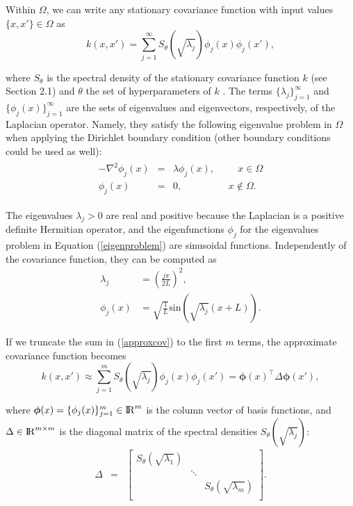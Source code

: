 \documentclass[]{interact}
\theoremstyle{plain}%
\theoremstyle{definition}
\theoremstyle{remark}
\begin{document}
Within $\Omega$, we can write any stationary covariance function with input values $\{x,x'\} \in \Omega$ as 
%
\begin{equation}\label{approxcov}
k(x,x') = \sum_{j=1}^\infty S_{\theta}(\sqrt{\lambda_j}) \phi_j(x) \phi_j(x'),
\end{equation} 

\noindent where $S_{\theta}$ is the spectral density of the stationary covariance function $k$ (see Section 2.1) and $\theta$ the set of hyperparameters of $k$ \citep{rasmussen2006gaussian}. The terms $\{\lambda_j\}_{j=1}^{\infty}$ and $\{\phi_j(x)\}_{j=1}^{\infty}$ are the sets of eigenvalues and eigenvectors, respectively, of the Laplacian operator. Namely, they satisfy the following eigenvalue problem in $\Omega$ when applying the Dirichlet boundary condition (other boundary conditions could be used as well):
%
\begin{eqnarray}\label{eigenproblem}
\begin{split}
-\nabla^2 \phi_j(x)&=&\lambda \phi_j(x), \hspace{1cm}  x \in \Omega \\ 
\phi_j(x)&=&0, \hspace{2cm} x \notin \Omega.
\end{split}
\end{eqnarray} 

\noindent The eigenvalues $\lambda_j>0$ are real and positive because the Laplacian is a positive definite Hermitian operator, and the eigenfunctions $\phi_j$ for the eigenvalues problem in Equation (\ref{eigenproblem}) are sinusoidal functions. Independently of the covariance function, they can be computed as
%
\begin{align}
\lambda_j&=\left(\frac{j\pi}{2L}\right)^2, \label{eigenvalue}\\
\phi_j(x)&=\sqrt{\frac{1}{L}} \text{sin}\left(\sqrt{\lambda_j}(x+L)\right). \label{eigenfunction}
\end{align}

If we truncate the sum in (\ref{approxcov}) to the first $m$ terms, the approximate covariance function becomes
%
\begin{equation}
k(x,x') \approx \sum_{j=1}^m S_{\theta}(\sqrt{\lambda_j}) \phi_j(x) \phi_j(x') = \bm{\phi}(x)^\intercal \Delta \bm{\phi}(x'), \nonumber
\end{equation}

\noindent where $\bm{\phi}(x)=\{\phi_j(x)\}_{j=1}^{m} \in {\rm I\!R}^{m}$ is the column vector of basis functions, and $\Delta  \in {\rm I\!R}^{m\times m}$ is the diagonal matrix of the spectral densities $S_{\theta}(\sqrt{\lambda_j})$: 
%
\begin{eqnarray}
\Delta &=&  \begin{bmatrix}
    S_{\theta}(\sqrt{\lambda_1}) & & \\
    & \ddots & \nonumber \\
    & & S_{\theta}(\sqrt{\lambda_m}) \\
  \end{bmatrix}.
\end{eqnarray}
\end{document}
